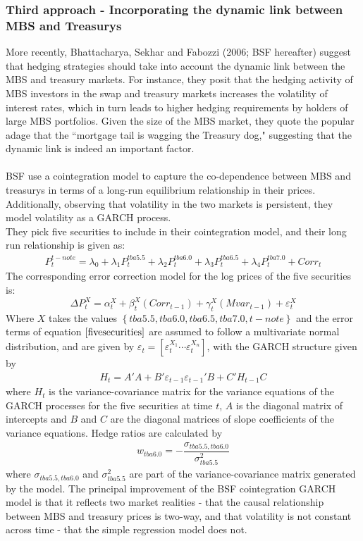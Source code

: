 \documentclass[10pt,letterpaper]{article}
\begin{document}
\subsubsection{Third approach - Incorporating the dynamic link between MBS and Treasurys}
More recently, Bhattacharya, Sekhar and Fabozzi (2006; BSF hereafter) suggest that hedging strategies should take into account the dynamic link between the MBS and treasury markets. For instance, they posit that the hedging activity of MBS investors in the swap and treasury markets increases the volatility of interest rates, which in turn leads to higher hedging requirements by holders of large MBS portfolios. Given the size of the MBS market, they quote the popular adage that the ``mortgage tail is wagging the Treasury dog," suggesting that the dynamic link is indeed an important factor.\\
\\
BSF use a cointegration model to capture the co-dependence between MBS and treasurys in terms of a long-run equilibrium relationship in their prices. Additionally, observing that volatility in the two markets is persistent, they model volatility as a GARCH process. \\
They pick five securities to include in their cointegration model, and their long run relationship is given as:
\begin{eqnarray}
P_t^{t-note} = \lambda_0 + \lambda_1 P_t^{tba5.5} + \lambda_2 P_t^{tba6.0} + \lambda_3 P_t^{tba6.5} + \lambda_4 P_t^{tba7.0} + Corr_t
\end{eqnarray}
The corresponding error correction model for the log prices of the five securities is:
\begin{equation}
\label{fivesecurities} \Delta P_t^X = \alpha_t^X + \beta_t^X(Corr_{t-1}) + \gamma_t^X(M var_{t-1}) + \varepsilon_t^X
\end{equation}
Where $X$ takes the values $\left\lbrace tba5.5, tba6.0, tba6.5, tba7.0, t-note \right\rbrace $ and the error terms of equation $\ref{fivesecurities}$ are assumed to follow a multivariate normal distribution, and are given by $\varepsilon_t = [ \varepsilon_t^{X_1} \cdots \varepsilon_t^{X_n} ]$, with the GARCH structure given by 
\begin{eqnarray}
H_t = A'A + B'\varepsilon_{t-1}\varepsilon_{t-1}'B + C'H_{t-1}C
\end{eqnarray}
where $H_t$ is the variance-covariance matrix for the variance equations of the GARCH processes for the five securities at time $t$, $A$ is the diagonal matrix of intercepts and $B$ and $C$ are the diagonal matrices of slope coefficients of the variance equations. Hedge ratios are calculated by 
\begin{eqnarray}
w_{tba6.0} = - \dfrac{\sigma_{tba5.5, tba6.0}}{\sigma^2_{tba5.5}}
\end{eqnarray}
where $\sigma_{tba5.5,tba6.0}$ and $\sigma_{tba5.5}^2$ are part of the variance-covariance matrix generated by the model. The principal improvement of the BSF cointegration GARCH model is that it reflects two market realities - that the causal relationship between MBS and treasury prices is two-way, and that volatility is not constant across time - that the simple regression model does not.
\end{document}
